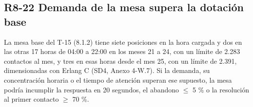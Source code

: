 \subsection*{R8-22 \textemdash{} Demanda de la mesa supera la dotación base}

La mesa base del T-15 (8.1.2) tiene siete posiciones en la hora cargada y dos en las otras 17 horas de 04:00 a 22:00 en los meses 21 a 24, con un límite de 2.283 contactos al mes, y tres en esas horas desde el mes 25, con un límite de 2.391, dimensionadas con Erlang C (SD4, Anexo 4-W.7). Si la demanda, su concentración horaria o el tiempo de atención superan ese supuesto, la mesa podría incumplir la respuesta en 20 segundos, el abandono \ensuremath{\leq} 5 \% o la resolución al primer contacto \ensuremath{\geq} 70 \%.

